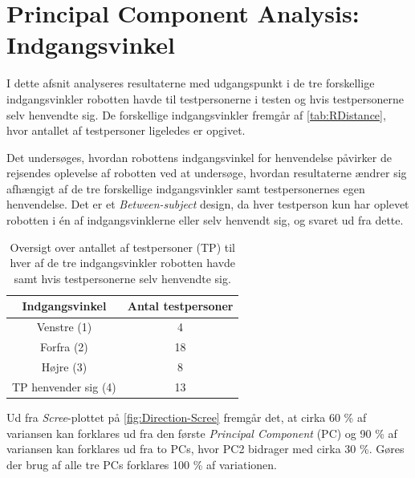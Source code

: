 \section{Principal Component Analysis: Indgangsvinkel}
\label{DatabehandlingRIndgangsvinkel}
%
I dette afsnit analyseres resultaterne med udgangspunkt i de tre forskellige indgangsvinkler robotten havde til testpersonerne i testen og hvis testpersonerne selv henvendte sig. De forskellige indgangsvinkler fremgår af \autoref{tab:RDistance}, hvor antallet af testpersoner ligeledes er opgivet. 

Det undersøges, hvordan robottens indgangsvinkel for henvendelse påvirker de rejsendes oplevelse af robotten ved at undersøge, hvordan resultaterne ændrer sig afhængigt af de tre forskellige indgangsvinkler samt testpersonernes egen henvendelse. Det er et \textit{Between-subject} design, da hver testperson kun har oplevet robotten i én af indgangsvinklerne eller selv henvendt sig, og svaret ud fra dette.
%
\begin{table}[H]
\centering
\begin{tabular}{c|c}
Indgangsvinkel & Antal testpersoner \\ \hline
Venstre (1) & 4    \\ \hline
Forfra (2) & 18    \\ \hline
Højre (3) & 8     \\ \hline
TP henvender sig (4) & 13 \\
\end{tabular}
\caption{Oversigt over antallet af testpersoner (TP) til hver af de tre indgangsvinkler robotten havde samt hvis testpersonerne selv henvendte sig.}
\label{tab:RDirection}
\end{table}
\newpage
\noindent
%
Ud fra \textit{Scree}-plottet på \autoref{fig:Direction-Scree} fremgår det, at cirka 60 \% af variansen kan forklares ud fra den første \textit{Principal Component} (PC) og 90 \% af variansen kan forklares ud fra to PCs, hvor PC2 bidrager med cirka 30 \%. Gøres der brug af alle tre PCs forklares 100 \% af variationen. 
%
